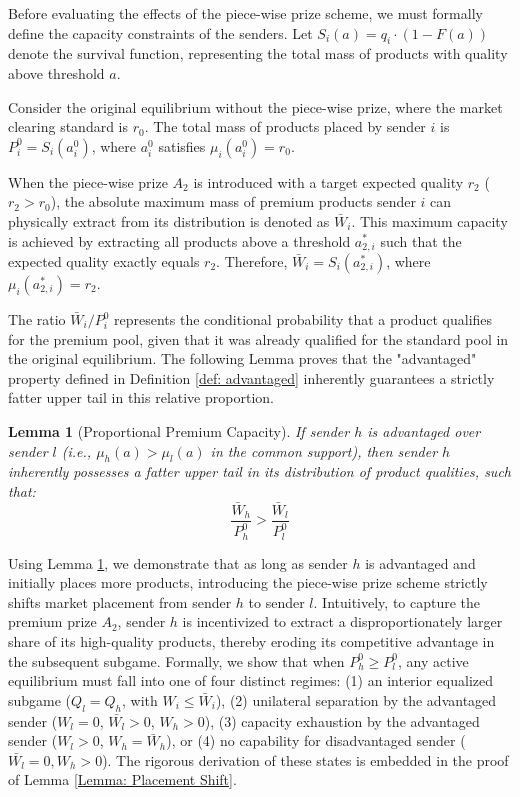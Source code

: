 \documentclass[12pt, a4paper]{article}
\newtheorem{lemma}{Lemma}
\begin{document}
Before evaluating the effects of the piece-wise prize scheme, we must formally define the capacity constraints of the senders. Let $S_i(a) =q_i \cdot (1-F(a))$ denote the survival function, representing the total mass of products with quality above threshold $a$. 

Consider the original equilibrium without the piece-wise prize, where the market clearing standard is $r_0$. The total mass of products placed by sender $i$ is $P_i^0 = S_i(a_i^0)$, where $a_i^0$ satisfies $\mu_i(a_i^0) = r_0$. 

When the piece-wise prize $A_2$ is introduced with a target expected quality $r_2$ ($r_2 > r_0$), the absolute maximum mass of premium products sender $i$ can physically extract from its distribution is denoted as $\bar{W}_i$. This maximum capacity is achieved by extracting all products above a threshold $a_{2,i}^*$ such that the expected quality exactly equals $r_2$. Therefore, $\bar{W}_i = S_i(a_{2,i}^*)$, where $\mu_i(a_{2,i}^*) = r_2$.

The ratio $\bar{W}_i / P_i^0$ represents the conditional probability that a product qualifies for the premium pool, given that it was already qualified for the standard pool in the original equilibrium. The following Lemma proves that the "advantaged" property defined in Definition \ref{def: advantaged} inherently guarantees a strictly fatter upper tail in this relative proportion.

\begin{lemma}[Proportional Premium Capacity]
\label{Lemma: Proportional Premium Capacity}
If sender $h$ is advantaged over sender $l$ (i.e., $\mu_h(a) > \mu_l(a)$ in the common support), then sender $h$ inherently possesses a fatter upper tail in its distribution of product qualities, such that:
\[
    \frac{\bar{W}_h}{P^0_h} > \frac{\bar{W}_l}{P^0_l}
\]
\end{lemma}

Using Lemma \ref{Lemma: Proportional Premium Capacity}, we demonstrate that as long as sender $h$ is advantaged and initially places more products, introducing the piece-wise prize scheme strictly shifts market placement from sender $h$ to sender $l$. Intuitively, to capture the premium prize $A_2$, sender $h$ is incentivized to extract a disproportionately larger share of its high-quality products, thereby eroding its competitive advantage in the subsequent subgame. Formally, we show that when $P^0_h \geq P^0_l$, any active equilibrium must fall into one of four distinct regimes: (1) an interior equalized subgame ($Q_l=Q_h$, with $W_i \leq \bar{W}_i$), (2) unilateral separation by the advantaged sender ($W_l=0$, $\bar{W_l}>0$, $W_h > 0$), (3) capacity exhaustion by the advantaged sender ($W_l > 0$, $W_h=\bar{W}_h$), or (4) no capability for disadvantaged sender ($\bar{W_l}=0, W_h > 0$). The rigorous derivation of these states is embedded in the proof of Lemma \ref{Lemma: Placement Shift}.
\end{document}
